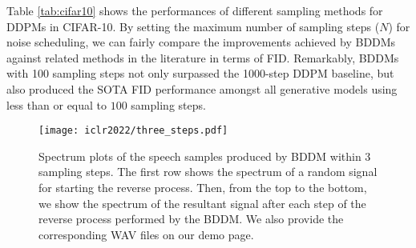 Table \ref{tab:cifar10} shows the performances of different sampling methods for DDPMs in CIFAR-10. By setting the maximum number of sampling steps ($N$) for noise scheduling, we can fairly compare the improvements achieved by BDDMs against related methods in the literature in terms of FID. Remarkably, BDDMs with 100 sampling steps not only surpassed the 1000-step DDPM baseline, but also produced the SOTA FID performance amongst all generative models using less than or equal to $100$ sampling steps.









\begin{figure}[H]
    \centering
    \texttt{[image: iclr2022/three\_steps.pdf]}
    \caption{Spectrum plots of the speech samples produced by BDDM within 3 sampling steps. The first row shows the spectrum of a random signal for starting the reverse process. Then, from the top to the bottom, we show the spectrum of the resultant signal after each step of the reverse process performed by the BDDM. We also provide the corresponding WAV files on our demo page.}
\end{figure}

